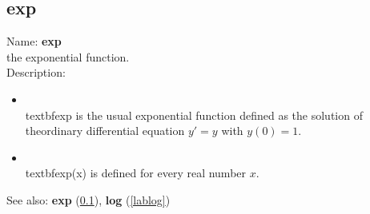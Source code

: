 \subsection{exp}
\label{labexp}
\noindent Name: \textbf{exp}\\
the exponential function.\\
\noindent Description: \begin{itemize}

\item \\textbf{exp} is the usual exponential function defined as the solution of the\n   ordinary differential equation $y'=y$ with $y(0)=1$.\n
\item \\textbf{exp}(x) is defined for every real number $x$.\n\end{itemize}
See also: \textbf{exp} (\ref{labexp}), \textbf{log} (\ref{lablog})
